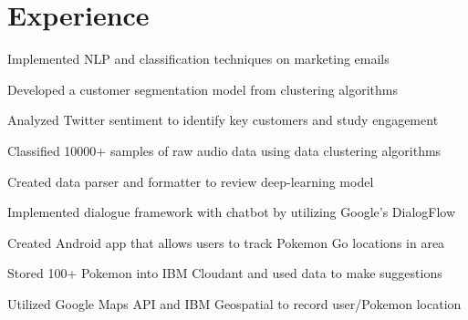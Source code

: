 \documentclass[]{deedy-resume-openfont}
\begin{document}
\hfill
\begin{minipage}[t]{0.66\textwidth} 


\section{Experience}

\sectionsep
\begin{tightemize} 
\item Implemented NLP and classification techniques on marketing emails
\item Developed a customer segmentation model from clustering algorithms
\item Analyzed Twitter sentiment to identify key customers and study engagement
\end{tightemize}
\sectionsep

\begin{tightemize} 
\item Classified 10000+ samples of raw audio data using data clustering algorithms
\item Created data parser and formatter to review deep-learning model
\item Implemented dialogue framework with chatbot by utilizing Google's DialogFlow
\end{tightemize}
\sectionsep


\begin{tightemize} 
\item Created Android app that allows users to track Pokemon Go locations in area 
\item Stored 100+ Pokemon into IBM Cloudant and used data to make suggestions
\item  Utilized Google Maps API and IBM Geospatial to record user/Pokemon location
\end{tightemize}
\sectionsep


\end{minipage}
\end{document}
